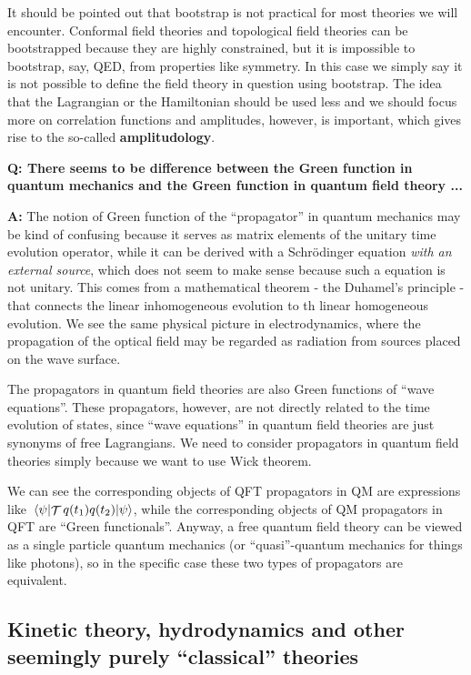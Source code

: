 \documentclass[hyperref, a4paper]{article}
\DeclareMathOperator{\timeorder}{\mathcal{T}}
\newcommand*{\concept}[1]{{\textbf{#1}}}
\newenvironment{qanda}{\setlength{\parindent}{0pt}}{\bigskip}
\newcommand{\Q}{\bigskip\bfseries Q: }
\newcommand{\A}{\par\textbf{A:} \normalfont}
\begin{document}
\begin{qanda}
It should be pointed out that bootstrap is not practical for most theories we will encounter. Conformal field theories and topological field theories can be bootstrapped because they are highly constrained, but it is impossible to bootstrap, say, QED, from properties like symmetry.
In this case we simply say it is not possible to define the field theory in question using bootstrap.
The idea that the Lagrangian or the Hamiltonian should be used less and we should focus more on correlation functions and amplitudes, however, is important, which gives rise to the so-called \concept{amplitudology}.

\Q There seems to be difference between the Green function in quantum mechanics and the Green function in quantum field theory ...
\A The notion of Green function of the ``propagator'' in quantum mechanics may be kind of confusing because it 
serves as matrix elements of the unitary time evolution operator, while it can be derived with a Schr\"{o}dinger 
equation \emph{with an external source}, which does not seem to make sense because such a equation is not unitary.
This comes from a mathematical theorem - the Duhamel's principle - that connects the linear inhomogeneous evolution
to th linear homogeneous evolution.
We see the same physical picture in electrodynamics, where the propagation of the optical field may be regarded
as radiation from sources placed on the wave surface.

The propagators in quantum field theories are also Green functions of ``wave equations''.
These propagators, however, are not directly related to the time evolution of states, since ``wave equations''
in quantum field theories are just synonyms of free Lagrangians. 
We need to consider propagators in quantum field theories simply because we want to use Wick theorem.

We can see the corresponding objects of QFT propagators in QM are expressions like $\mel{\psi}{\timeorder q(t_1) q(t_2)}{\psi}$,
while the corresponding objects of QM propagators in QFT are ``Green functionals''.
Anyway, a free quantum field theory can be viewed as a single particle quantum mechanics (or ``quasi''-quantum mechanics for things like photons), so in the specific case these two types of propagators are equivalent.

\end{qanda}

\subsection{Kinetic theory, hydrodynamics and other seemingly purely ``classical'' theories}
\end{document}
